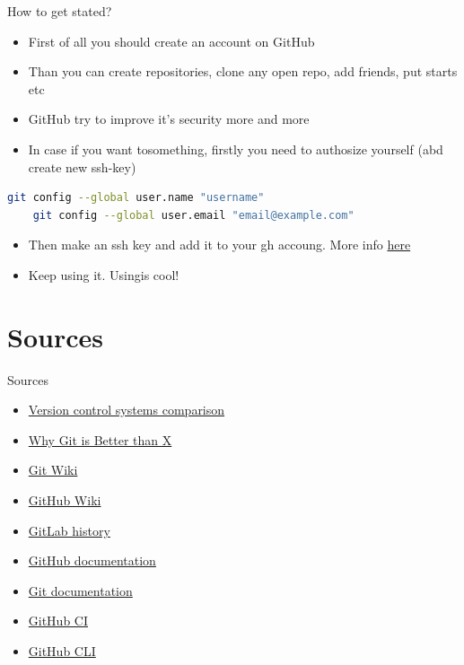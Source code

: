\documentclass[usenames,dvipsnames,10pt,aspectratio=169]{beamer}
\begin{document}
\begin{frame}[fragile]{How to get stated?}
    \begin{itemize}
        \item First of all you should create an account on GitHub 
        \item Than you can create repositories, clone any open repo, add friends, put starts etc
        \item GitHub try to improve it's security more and more
        \item In case if you want tosomething, firstly you need to authosize yourself (abd create new ssh-key)
    \end{itemize}
\begin{lstlisting}[language=Bash, style=shellstyle] 
    git config --global user.name "username"
    git config --global user.email "email@example.com"\end{lstlisting}
    \begin{itemize}
        \item Then make an ssh key and add it to your gh accoung. More info \href{https://docs.github.com/en/authentication/connecting-to-github-with-ssh}{here}
        \item Keep using it. Usingis cool!
    \end{itemize}

\end{frame}




\section{Sources}
\begin{frame}{Sources}
    \begin{itemize}
       \item \href{https://en.wikipedia.org/wiki/Comparison_of_version-control_software}{Version control systems comparison}
       \item \href{https://translatedby.com/you/why-git-is-better-than-x/original/}{Why Git is Better than X}
       \item \href{https://en.wikipedia.org/wiki/Git}{Git Wiki}
       \item \href{https://en.wikipedia.org/wiki/GitHub}{GitHub Wiki}
       \item \href{https://about.gitlab.com/company/history/}{GitLab history}
       \item \href{https://docs.github.com/en}{GitHub documentation}
       \item \href{https://git-scm.com/}{Git documentation}
       \item \href{https://docs.github.com/en/actions/guides/about-continuous-integration}{GitHub CI}
       \item \href{https://cli.github.com/}{GitHub CLI}
    \end{itemize}
\end{frame}
\end{document}

